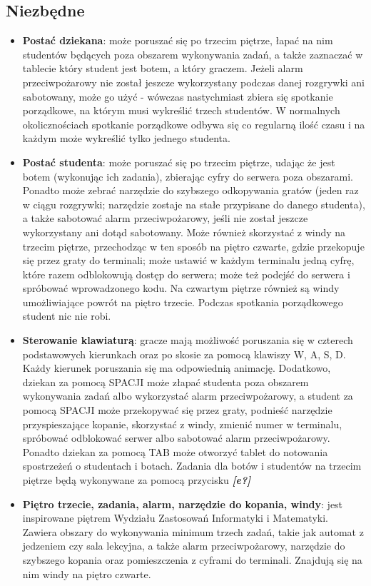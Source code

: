 \documentclass[]{report}
\begin{document}
\subsection{Niezbędne}
\begin{itemize}
	\item \textbf{Postać dziekana}: może poruszać się po trzecim piętrze, łapać na nim studentów będących poza obszarem wykonywania zadań, a także zaznaczać w tablecie który student jest botem, a który graczem. Jeżeli alarm przeciwpożarowy nie został jeszcze wykorzystany podczas danej rozgrywki ani sabotowany, może go użyć - wówczas nastychmiast zbiera się spotkanie porządkowe, na którym musi wykreślić trzech studentów. W normalnych okolicznościach spotkanie porządkowe odbywa się co regularną ilość czasu i na każdym może wykreślić tylko jednego studenta.
	\item \textbf{Postać studenta}: może poruszać się po trzecim piętrze, udając że jest botem (wykonując ich zadania), zbierając cyfry do serwera poza obszarami. Ponadto może zebrać narzędzie do szybszego odkopywania gratów (jeden raz w ciągu rozgrywki; narzędzie zostaje na stałe przypisane do danego studenta), a także sabotować alarm przeciwpożarowy, jeśli nie został jeszcze wykorzystany ani dotąd sabotowany. Może również skorzystać z windy na trzecim piętrze, przechodząc w ten sposób na piętro czwarte, gdzie przekopuje się przez graty do terminali; może ustawić w każdym terminalu jedną cyfrę, które razem odblokowują dostęp do serwera; może też podejść do serwera i spróbować wprowadzonego kodu. Na czwartym piętrze również są windy umożliwiające powrót na piętro trzecie. Podczas spotkania porządkowego student nic nie robi.
	\item \textbf{Sterowanie klawiaturą}: gracze mają możliwość poruszania się w czterech podstawowych kierunkach oraz po skosie za pomocą klawiszy W, A, S, D. Każdy kierunek poruszania się ma odpowiednią animację. Dodatkowo, dziekan za pomocą SPACJI może złapać studenta poza obszarem wykonywania zadań albo wykorzystać alarm przeciwpożarowy, a student za pomocą SPACJI może przekopywać się przez graty, podnieść narzędzie przyspieszające kopanie, skorzystać z windy, zmienić numer w terminalu, spróbować odblokować serwer albo sabotować alarm przeciwpożarowy. Ponadto dziekan za pomocą TAB może otworzyć tablet do notowania spostrzeżeń o studentach i botach. Zadania dla botów i studentów na trzecim piętrze będą wykonywane za pomocą przycisku \textbf{\textit{[e?]}}
	\item \textbf{Piętro trzecie, zadania, alarm, narzędzie do kopania, windy}: jest inspirowane piętrem Wydziału Zastosowań Informatyki i Matematyki. Zawiera obszary do wykonywania minimum trzech zadań, takie jak automat z jedzeniem czy sala lekcyjna, a także alarm przeciwpożarowy, narzędzie do szybszego kopania oraz pomieszczenia z cyframi do terminali. Znajdują się na nim windy na piętro czwarte.

\end{itemize}
\end{document}
